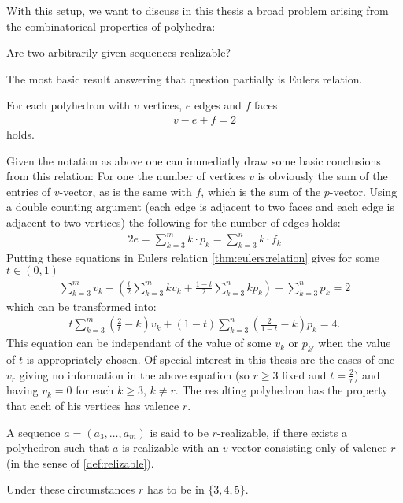 With this setup, we want to discuss in this thesis a broad problem arising from the combinatorical properties of polyhedra:
\begin{problem} Are two arbitrarily given sequences realizable?
\end{problem}
The most basic result answering that question partially is Eulers relation.
\begin{theorem}\label{thm:eulers:relation}
  For each polyhedron with $v$ vertices, $e$ edges and $f$ faces
  \begin{align*}
    v - e + f = 2
  \end{align*}
  holds.
\end{theorem}
Given the notation as above one can immediatly draw some basic conclusions from this relation: For one the number of vertices $v$ is obviously the sum of the entries of $v$-vector, as is the same with $f$, which is the sum of the $p$-vector. Using a double counting argument (each edge is adjacent to two faces and each edge is adjacent to two vertices) the following for the number of edges holds:
\begin{align*}
  2e = \sum_{k=3}^{m} k \cdot p_k = \sum_{k=3}^{n} k \cdot f_k
\end{align*}
Putting these equations in Eulers relation \autoref{thm:eulers:relation} gives for some $t \in (0, 1)$
\begin{align*}
  \sum_{k=3}^m v_k - \left(\frac{t}{2} \sum_{k=3}^m k v_k + \frac{1-t}{2} \sum_{k=3}^n k p_k \right) + \sum_{k=3}^n p_k = 2
\end{align*}
which can be transformed into:
\begin{align*}
  t \sum_{k=3}^m \left(\frac{2}{t} - k \right) v_k + (1-t) \sum_{k=3}^n \left( \frac{2}{1-t} - k \right) p_k = 4.
\end{align*}
This equation can be independant of the value of some $v_k$ or $p_{k'}$ when the value of $t$ is appropriately chosen. Of special interest in this thesis are the cases of one $v_r$ giving no information in the above equation (so $r \geq 3$ fixed and $t = \frac{2}{r}$) and having $v_{k} = 0$ for each $k \geq 3$, $k \neq r$. The resulting polyhedron has the property that each of his vertices has valence $r$. 
\begin{definition}[$r$-realizable]
  A sequence $a = (a_3, \dots, a_m)$ is said to be $r$-realizable, if there exists a polyhedron such that $a$ is realizable with an $v$-vector consisting only of valence $r$ (in the sense of \autoref{def:relizable}).
\end{definition}
Under these circumstances $r$ has to be in $\{3, 4, 5\}$.

